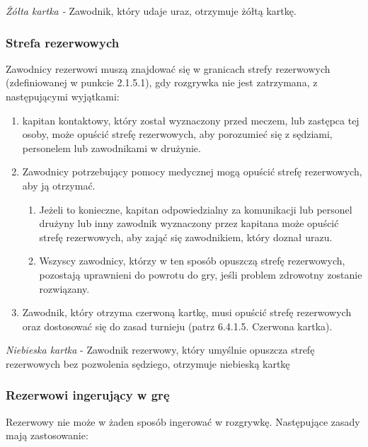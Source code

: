 \documentclass[12pt]{article}
\begin{document}
\emph{Żółta kartka -} Zawodnik, który udaje uraz, otrzymuje żółtą
kartkę.

\subsubsection{Strefa rezerwowych}

Zawodnicy rezerwowi muszą znajdować się w granicach strefy rezerwowych
(zdefiniowanej w punkcie 2.1.5.1), gdy rozgrywka nie jest zatrzymana, z
następującymi wyjątkami:

\begin{enumerate}
	\item
	      kapitan kontaktowy, który został wyznaczony przed meczem, lub zastępca
	      tej osoby, może opuścić strefę rezerwowych, aby porozumieć się z
	      sędziami, personelem lub zawodnikami w drużynie.
	\item
	      Zawodnicy potrzebujący pomocy medycznej mogą opuścić strefę
	      rezerwowych, aby ją otrzymać.

	      \begin{enumerate}
		      \item
		            Jeżeli to konieczne, kapitan odpowiedzialny za komunikacji lub
		            personel drużyny lub inny zawodnik wyznaczony przez kapitana może
		            opuścić strefę rezerwowych, aby zająć się zawodnikiem, który doznał
		            urazu.
		      \item
		            Wszyscy zawodnicy, którzy w ten sposób opuszczą strefę rezerwowych,
		            pozostają uprawnieni do powrotu do gry, jeśli problem zdrowotny
		            zostanie rozwiązany.
	      \end{enumerate}
	\item
	      Zawodnik, który otrzyma czerwoną kartkę, musi opuścić strefę
	      rezerwowych oraz dostosować się do zasad turnieju (patrz 6.4.1.5.
	      Czerwona kartka).
\end{enumerate}

\emph{Niebieska kartka} - Zawodnik rezerwowy, który umyślnie opuszcza
strefę rezerwowych bez pozwolenia sędziego, otrzymuje niebieską kartkę

\subsubsection{Rezerwowi ingerujący w grę}

Rezerwowy nie może w żaden sposób ingerować w rozgrywkę. Następujące
zasady mają zastosowanie:
\end{document}
